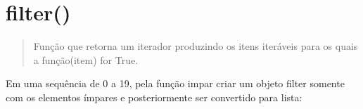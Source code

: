 \documentclass[letterpaper,10pt,brazil]{sphinxmanual}
\begin{document}
\begin{sphinxVerbatim}[commandchars=\\\{\}]
\end{sphinxVerbatim}


\section{filter()}
\label{\detokenize{content/built-ins:filter}}\begin{quote}

Função que retorna um iterador produzindo os itens iteráveis para os quais a função(item) for True.
\end{quote}

\begin{sphinxVerbatim}[commandchars=\\\{\}]
 
         

\end{sphinxVerbatim}

\begin{sphinxVerbatim}[commandchars=\\\{\}]
\end{sphinxVerbatim}

\begin{sphinxVerbatim}[commandchars=\\\{\}]
\end{sphinxVerbatim}

\begin{sphinxVerbatim}[commandchars=\\\{\}]
\end{sphinxVerbatim}

Em uma sequência de 0 a 19, pela função impar criar um objeto filter somente com os elementos ímpares e posteriormente ser convertido para lista:

\begin{sphinxVerbatim}[commandchars=\\\{\}]
    
\end{sphinxVerbatim}
\end{document}
